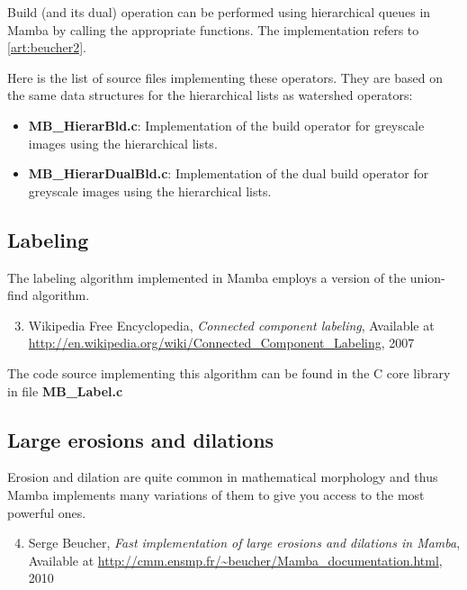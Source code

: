 \documentclass[a4paper,10pt,oneside]{article}
\begin{document}
Build (and its dual) operation can be performed using hierarchical queues in
Mamba by calling the appropriate functions. The implementation refers to
\ref{art:beucher2}.

Here is the list of source files implementing these operators. They are based on
the same data structures for the hierarchical lists as watershed operators:

\begin{itemize}
\item \textbf{MB\_HierarBld.c}: Implementation of the build operator for
greyscale images using the hierarchical lists.
\item \textbf{MB\_HierarDualBld.c}: Implementation of the dual build operator
for greyscale images using the hierarchical lists.
\end{itemize}

\subsection{Labeling}

The labeling algorithm implemented in Mamba employs a version of the union-find 
algorithm.

\begin{enumerate}
\setcounter{enumi}{2}
\item \label{art:wikipedia} Wikipedia Free Encyclopedia, 
\emph{Connected component labeling},
Available at \url{http://en.wikipedia.org/wiki/Connected\_Component\_Labeling}, 2007
\end{enumerate}

The code source implementing this algorithm can be found in the C core library
in file \textbf{MB\_Label.c}

\subsection{Large erosions and dilations}
\label{cha:opt_ero_dil}

Erosion and dilation are quite common in mathematical morphology and thus Mamba
implements many variations of them to give you access to the most powerful ones.

\begin{enumerate}
\setcounter{enumi}{3}
\item \label{art:beucher1} Serge Beucher,
\emph{Fast implementation of large erosions and dilations in Mamba},
Available at \url{http://cmm.ensmp.fr/\~beucher/Mamba\_documentation.html}, 2010
\end{enumerate}
\end{document}
